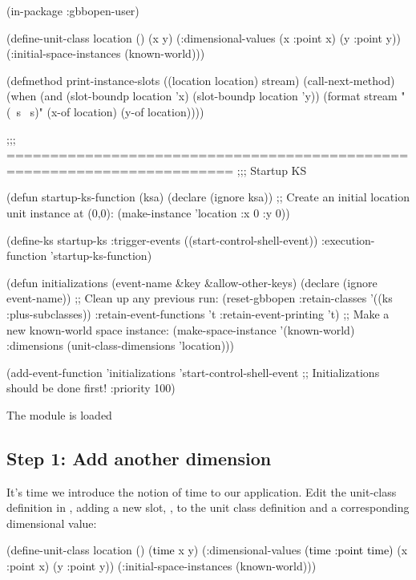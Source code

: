 \documentclass[10pt,twoside,english,pdftex]{article}
\begin{document}
\begin{example}
  (in-package :gbbopen-user)

  (define-unit-class location ()
    (x y)
    (:dimensional-values
      (x :point x)
      (y :point y))
    (:initial-space-instances (known-world)))

  (defmethod print-instance-slots ((location location) stream)
    (call-next-method)
    (when (and (slot-boundp location 'x)
               (slot-boundp location 'y))
      (format stream " (~s ~s)"
              (x-of location)
              (y-of location))))

  ;;; ========================================================================
  ;;;   Startup KS

  (defun startup-ks-function (ksa)
    (declare (ignore ksa))
    ;; Create an initial location unit instance at (0,0):
    (make-instance 'location :x 0 :y 0))

  (define-ks startup-ks
      :trigger-events ((start-control-shell-event))
      :execution-function 'startup-ks-function)

  (defun initializations (event-name &key &allow-other-keys)
    (declare (ignore event-name))
    ;; Clean up any previous run:
    (reset-gbbopen :retain-classes '((ks :plus-subclasses))
                   :retain-event-functions 't
                   :retain-event-printing 't)
    ;; Make a new known-world space instance:
    (make-space-instance 
     '(known-world)
     :dimensions (unit-class-dimensions 'location)))

  (add-event-function 'initializations 'start-control-shell-event
                      ;; Initializations should be done first!
                      :priority 100)
\end{example}

\begin{tightitemize}
\item The  module is loaded
\end{tightitemize}

\subsection*{Step 1: Add  another dimension}

It's time we introduce the notion of time to our application.  Edit the
 unit-class definition in , adding
a new slot, , to the  unit class definition and a
corresponding  dimensional value:
%
\begin{example}\color{darkergray}%
  (define-unit-class location ()
    (\textcolor{black}{time} 
     x y)
    (:dimensional-values
      \textcolor{black}{(time :point time)}
      (x :point x)
      (y :point y))
    (:initial-space-instances (known-world)))
\end{example}
\end{document}
